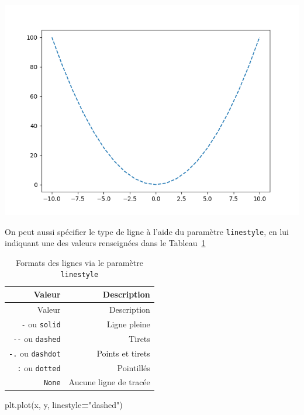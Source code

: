 \documentclass[12pt,]{book}
\newenvironment{Shaded}{\begin{snugshade}}{\end{snugshade}}
\newcommand{\StringTok}[1]{\textcolor[rgb]{0.31,0.60,0.02}{#1}}
\newcommand{\OperatorTok}[1]{\textcolor[rgb]{0.81,0.36,0.00}{\textbf{#1}}}
\newcommand{\NormalTok}[1]{#1}
\numberwithin{equation}{section}
\numberwithin{countremarque}{section}
\begin{document}
\begin{center}\includegraphics[width=9.03in]{figs/pyplot/lignes_tirets} \end{center}

On peut aussi spécifier le type de ligne à l'aide du paramètre
\texttt{linestyle}, en lui indiquant une des valeurs renseignées dans le
Tableau~\ref{tab:fmt-lignes-2}

\begin{longtable}[]{@{}rr@{}}
\caption{\label{tab:fmt-lignes-2} Formats des lignes via le paramètre
\texttt{linestyle}}\tabularnewline
\toprule
Valeur & Description\tabularnewline
\midrule
\endfirsthead
\toprule
Valeur & Description\tabularnewline
\midrule
\endhead
\texttt{-} ou \texttt{solid} & Ligne pleine\tabularnewline
\texttt{-\/-} ou \texttt{dashed} & Tirets\tabularnewline
\texttt{-.} ou \texttt{dashdot} & Points et tirets\tabularnewline
\texttt{:} ou \texttt{dotted} & Pointillés\tabularnewline
\texttt{None} & Aucune ligne de tracée\tabularnewline
\bottomrule
\end{longtable}

\begin{Shaded}
\begin{Highlighting}[]
\NormalTok{plt.plot(x, y, linestyle}\OperatorTok{=}\StringTok{"dashed"}\NormalTok{)}
\end{Highlighting}
\end{Shaded}
\end{document}
